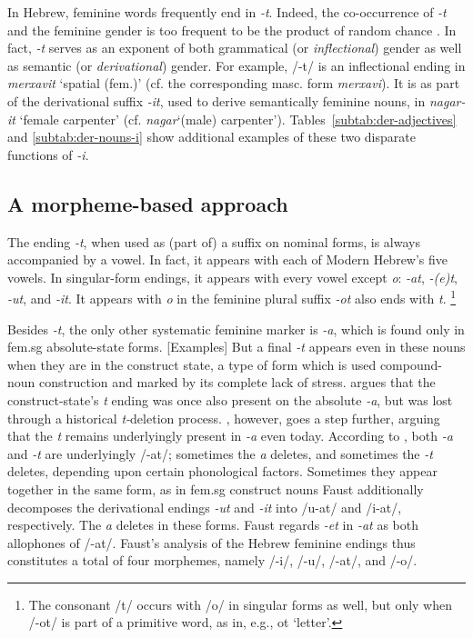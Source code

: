 In Hebrew, feminine words frequently 
end in \textit{-t}. Indeed, the co-occurrence of \textit{-t} and the feminine gender is 
too frequent to be the product of random chance \citep{faust:2013}.
In fact, \textit{-t} serves as an exponent of both grammatical (or \emph{inflectional}) 
gender as well as semantic (or \emph{derivational}) gender. For example, /-t/ 
is an inflectional ending in \textit{merxavit} `spatial (fem.)' 
(cf. the corresponding masc. form \textit{merxavi}). 
It is as part of the derivational suffix \textit{-it}, used to 
derive semantically feminine nouns, in \textit{nagar-it} 
`female carpenter' (cf. \textit{nagar}`(male) carpenter'). 
Tables~\ref{subtab:der-adjectives} and \ref{subtab:der-nouns-i} 
show additional
examples of these two disparate functions of \textit{-i}.

\subsection{A morpheme-based approach}
The ending \textit{-t}, when used as (part of) a suffix on 
nominal forms, is always accompanied by a vowel. 
In fact, it appears with each of Modern Hebrew's five vowels.
In singular-form endings, it appears with every vowel except 
\textit{o}: \textit{-at}, \textit{-(e)t}, \textit{-ut}, and \textit{-it}. 
It appears with \textit{o} in the feminine plural suffix \textit{-ot} 
also ends with \textit{t}. \footnote{The consonant /t/ occurs with 
/o/ in singular forms as well, but only when /-ot/ is part of a 
primitive word, as in, e.g., ot `letter'.}

Besides \textit{-t}, the only other systematic feminine marker is 
\textit{-a}, which is found only 
in fem.sg absolute-state forms. [Examples]
But a final \textit{-t} appears even in these nouns when they are 
in the construct state, a type of form which is used compound-noun 
construction and marked by its complete lack of stress.
\cite{schwarzwald:1982} argues that
the construct-state's \textit{t} ending was once also 
present on the absolute \textit{-a}, but was lost through a historical
\textit{t-}deletion process. \cite{faust:2013}, however, 
goes a step further, arguing that the \textit{t} remains 
underlyingly present in \textit{-a} even today. According 
to \cite{faust:2013}, both
\textit{-a} and \textit{-t} are underlyingly /-at/; sometimes 
the \textit{a} deletes, and sometimes the \textit{-t} deletes, depending 
upon certain phonological factors. Sometimes they appear 
together in the same form, as in fem.sg construct nouns
Faust additionally decomposes the derivational endings 
\textit{-ut} and \textit{-it} into /u-at/ and /i-at/, respectively. 
The \textit{a} deletes in these forms.
Faust regards \textit{-et} in \textit{-at} as both allophones of /-at/. 
Faust's analysis of the Hebrew feminine endings thus constitutes a total of 
four morphemes, namely /-i/, /-u/, /-at/, and /-o/.
  
